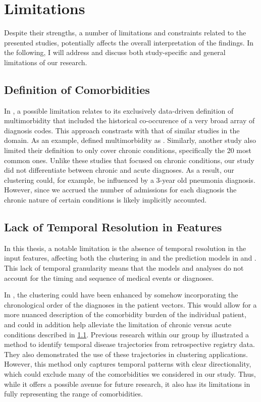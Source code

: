 \section{Limitations}

Despite their strengths,
a number of limitations and constraints
related to the presented studies,
potentially affects the overall interpretation of the findings.
In the following,
I will address and discuss both study-specific
and general limitations of our research.

\subsection{Definition of Comorbidities}
\label{sec:comorbidities}

In \studyi{},
a possible limitation relates to its exclusively data-driven definition
of multimorbidity that included the historical co-occurence of a very broad 
array of diagnosis codes.
This approach constrasts with that of similar studies in the domain.
As an example, 
\textcite{formanMultimorbidity2018}
defined multimorbidity as
. 
Similarly, another study also limited their definition
to only cover chronic conditions, specifically the 20 most
common ones.
\autocite{roccaPrevalence2014}
Unlike these studies that focused on chronic conditions,
our study did not differentiate between chronic and acute diagnoses. 
As a result, our clustering could, for example, 
be influenced by a 3-year old pneumonia diagnosis.
However, since we accrued the number of admissions for each diagnosis
the chronic nature of certain conditions is likely implicitly accounted.

\subsection{Lack of Temporal Resolution in Features}

In this thesis, a notable limitation is the absence of temporal resolution in
the input features, affecting both the clustering in \studyi{} and the
prediction models in \studyii{} and \studyiii{}. This lack of temporal
granularity means that the models and analyses do not account for the timing
and sequence of medical events or diagnoses.

In \studyi{}, the clustering could have been enhanced by somehow 
incorporating the chronological order of the diagnoses in the patient vectors.
This would allow for a more nuanced description of the comorbidity burden
of the individual patient, and could in addition help alleviate the limitation
of chronic versus acute conditions described in \cref{sec:comorbidities}.
Previous research within our group by \textcite{jensenTemporal2014} illustrated
a method to identify temporal disease trajectories from retrospective registry
data. They also demonstrated the use of these trajectories in clustering
applications. However, this method only captures temporal patterns with clear
directionality, which could exclude many of the comorbidities we considered in
our study. Thus, while it offers a possible avenue for future research,
it also has its limitations in fully representing the range of
comorbidities.

